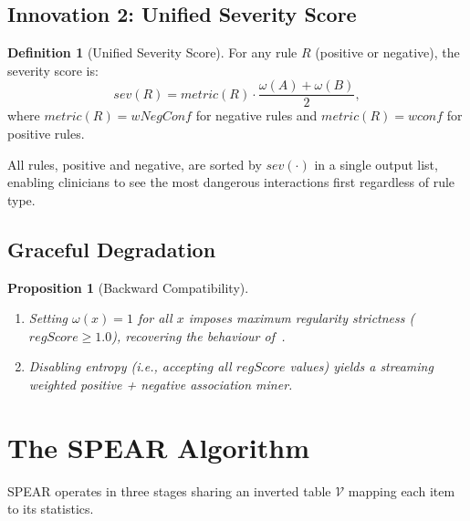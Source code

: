 \documentclass[10pt,twocolumn]{article}
\theoremstyle{plain}
\newtheorem{proposition}[theorem]{Proposition}
\theoremstyle{definition}
\newtheorem{definition}{Definition}[section]
\theoremstyle{remark}
\newcommand{\ie}{\textit{i.e.},\xspace}
\newcommand{\wconf}{\mathit{wconf}}
\newcommand{\wNegConf}{\mathit{wNegConf}}
\newcommand{\regscore}{\mathit{regScore}}
\begin{document}
\subsection{Innovation 2: Unified Severity Score}
\label{subsec:unified}

\begin{definition}[Unified Severity Score]
\label{def:severity}
For any rule $R$ (positive or negative), the severity score is:
\begin{equation}
  \mathit{sev}(R)
    = \mathit{metric}(R) \cdot \frac{\omega(A) + \omega(B)}{2},
  \label{eq:severity}
\end{equation}
where $\mathit{metric}(R) = \wNegConf$ for negative rules and
$\mathit{metric}(R) = \wconf$ for positive rules.
\end{definition}

All rules, positive and negative, are sorted by
$\mathit{sev}(\cdot)$ in a single output list, enabling clinicians
to see the most dangerous interactions first regardless of rule type.

\subsection{Graceful Degradation}

\begin{proposition}[Backward Compatibility]
\label{prop:degradation}
\begin{enumerate}[label=(\roman*)]
  \item Setting $\omega(x) = 1$ for all $x$ imposes maximum
        regularity strictness ($\regscore \geq 1.0$), recovering
        the behaviour of~\cite{sastry2025}.
  \item Disabling entropy (\ie accepting all $\regscore$ values)
        yields a streaming weighted positive + negative association
        miner.
\end{enumerate}
\end{proposition}

\section{The SPEAR Algorithm}
\label{sec:algorithm}

SPEAR operates in three stages sharing an inverted table $\mathcal{V}$
mapping each item to its statistics.
\end{document}
